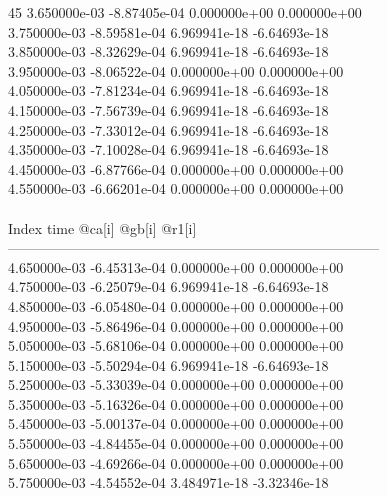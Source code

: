 45	3.650000e-03	-8.87405e-04	0.000000e+00	0.000000e+00	\\ 	3.750000e-03	-8.59581e-04	6.969941e-18	-6.64693e-18	\\ 	3.850000e-03	-8.32629e-04	6.969941e-18	-6.64693e-18	\\ 	3.950000e-03	-8.06522e-04	0.000000e+00	0.000000e+00	\\ 	4.050000e-03	-7.81234e-04	6.969941e-18	-6.64693e-18	\\ 	4.150000e-03	-7.56739e-04	6.969941e-18	-6.64693e-18	\\ 	4.250000e-03	-7.33012e-04	6.969941e-18	-6.64693e-18	\\ 	4.350000e-03	-7.10028e-04	6.969941e-18	-6.64693e-18	\\ 	4.450000e-03	-6.87766e-04	0.000000e+00	0.000000e+00	\\ 	4.550000e-03	-6.66201e-04	0.000000e+00	0.000000e+00	\\ \hline
\\ \hline
Index   time            @ca[i]          @gb[i]          @r1[i]          \\ \hline
--------------------------------------------------------------------------------\\ 	4.650000e-03	-6.45313e-04	0.000000e+00	0.000000e+00	\\ 	4.750000e-03	-6.25079e-04	6.969941e-18	-6.64693e-18	\\ 	4.850000e-03	-6.05480e-04	0.000000e+00	0.000000e+00	\\ 	4.950000e-03	-5.86496e-04	0.000000e+00	0.000000e+00	\\ 	5.050000e-03	-5.68106e-04	0.000000e+00	0.000000e+00	\\ 	5.150000e-03	-5.50294e-04	6.969941e-18	-6.64693e-18	\\ 	5.250000e-03	-5.33039e-04	0.000000e+00	0.000000e+00	\\ 	5.350000e-03	-5.16326e-04	0.000000e+00	0.000000e+00	\\ 	5.450000e-03	-5.00137e-04	0.000000e+00	0.000000e+00	\\ 	5.550000e-03	-4.84455e-04	0.000000e+00	0.000000e+00	\\ 	5.650000e-03	-4.69266e-04	0.000000e+00	0.000000e+00	\\ 	5.750000e-03	-4.54552e-04	3.484971e-18	-3.32346e-18	\\ \hline
